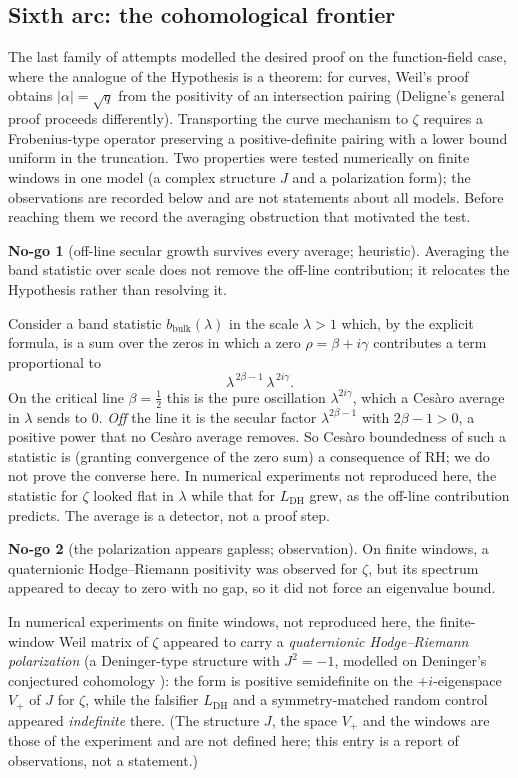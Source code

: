 \documentclass[11pt]{amsart}
\theoremstyle{definition}
\theoremstyle{remark}
\theoremstyle{definition}
\newtheorem{nogo}{No-go}[section]
\begin{document}
\subsection{Sixth arc: the cohomological frontier}\label{sec:arcF}

The last family of attempts modelled the desired proof on the function-field case, where the analogue of
the Hypothesis is a theorem: for curves, Weil's proof \cite{Weil1948} obtains $|\alpha|=\sqrt q$ from the
positivity of an intersection pairing (Deligne's general proof \cite{Deligne} proceeds differently).
Transporting the curve mechanism to $\zeta$ requires a Frobenius-type operator preserving a
positive-definite pairing with a lower bound uniform in the truncation. Two properties were tested
numerically on finite windows in one model (a complex structure $J$ and a polarization form); the
observations are recorded below and are not statements about all models. Before reaching them we record
the averaging obstruction that motivated the test.

\begin{nogo}[off-line secular growth survives every average; heuristic]\label{ng:cesaro}
Averaging the band statistic over scale does not remove the off-line contribution; it relocates the
Hypothesis rather than resolving it.
\end{nogo}
\noindent Consider a band statistic $b_{\mathrm{bulk}}(\lambda)$ in the scale $\lambda>1$ which, by the
explicit formula, is a sum over the zeros in which a zero $\rho=\beta+i\gamma$ contributes a term
proportional to
\[
   \lambda^{\,2\beta-1}\,\lambda^{\,2i\gamma}.
\]
On the critical line $\beta=\tfrac12$ this is the pure oscillation $\lambda^{2i\gamma}$, which a Ces\`aro
average in $\lambda$ sends to $0$. \emph{Off} the line it is the secular factor $\lambda^{2\beta-1}$ with
$2\beta-1>0$, a positive power that no Ces\`aro average removes. So Ces\`aro boundedness of such a
statistic is (granting convergence of the zero sum) a consequence of RH; we do not prove the converse
here. In numerical experiments not reproduced here, the statistic for $\zeta$ looked flat in $\lambda$
while that for $L_{\mathrm{DH}}$ grew, as the off-line contribution predicts. The average is a detector,
not a proof step.

\begin{nogo}[the polarization appears gapless; observation]\label{ng:gapless}
On finite windows, a quaternionic Hodge--Riemann positivity was observed for $\zeta$, but its spectrum
appeared to decay to zero with no gap, so it did not force an eigenvalue bound.
\end{nogo}
\noindent In numerical experiments on finite windows, not reproduced here, the finite-window Weil matrix
of $\zeta$ appeared to carry a \emph{quaternionic Hodge--Riemann polarization} (a Deninger-type structure with $J^2=-1$,
modelled on Deninger's conjectured cohomology \cite{Deninger}): the form is positive semidefinite on the
$+i$-eigenspace $V_+$ of $J$ for $\zeta$, while the falsifier $L_{\mathrm{DH}}$ and a symmetry-matched
random control appeared \emph{indefinite} there. (The structure $J$, the space $V_+$ and the windows are
those of the experiment and are not defined here; this entry is a report of observations, not a
statement.)
\end{document}
